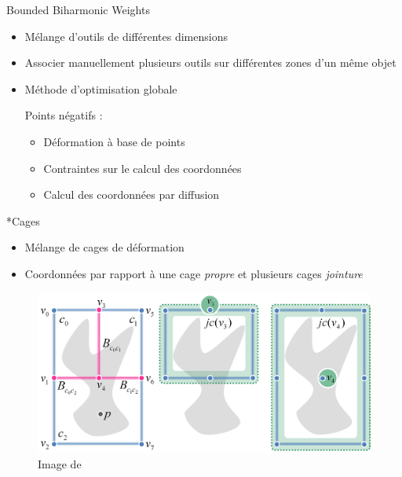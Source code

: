 \documentclass[xcolor=x11names,compress]{beamer}
\renewcommand{\(}{\begin{columns}} \renewcommand{\)}{\end{columns}}
\newcommand{\<}[1]{\begin{column}{#1}} \renewcommand{\>}{\end{column}}
\begin{document}
\begin{frame}{Bounded Biharmonic Weights}
  \begin{itemize}
  \item Mélange d'outils de différentes dimensions
  \item Associer manuellement plusieurs outils sur différentes zones
    d'un même objet
  \item Méthode d'optimisation globale
    \begin{alertblock}{Points négatifs : }
      \begin{itemize}
      \item Déformation à base de points
      \item Contraintes sur le calcul des coordonnées
      \item Calcul des coordonnées par diffusion
      \end{itemize}
    \end{alertblock}
  \end{itemize}
\end{frame}

\begin{frame}{*Cages}
  \begin{itemize}
  \item Mélange de cages de déformation
  \item Coordonnées par rapport à une cage \textit{propre} et
    plusieurs cages \textit{jointure}
  \end{itemize}
  \begin{figure}[h]
    \begin{center}
      \includegraphics[scale=0.07]{joinCages}
    \end{center}
    \caption{Image de \cite{GPCP13}}
  \end{figure}
\end{frame}
\end{document}

